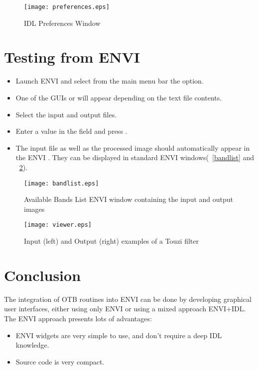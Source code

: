 \begin{figure}
\label{preferences}
\begin{center}
\texttt{[image: preferences.eps]}
\caption{IDL Preferences Window}
\end{center}
\end{figure}



\section{Testing from ENVI}
\begin{itemize}
    \item Launch ENVI and select from the main menu bar the  option.
    \item One of the GUIs  or  will appear depending on the  text file contents. 
    \item Select the input and output files. 
    \item Enter a value in the  field and press .
    \item The input file as well as the processed image should automatically appear in the ENVI  . 
          They can be displayed in standard ENVI windows(~\ref{bandlist} and ~\ref{viewer}).
\end{itemize}

\begin{figure}
    \begin{minipage}[b]{.46\linewidth}
        \centering\texttt{[image: bandlist.eps]}
        \caption{ Available Bands List ENVI window containing the input and output images}
        \label{bandlist}
    \end{minipage} \hfill
    \begin{minipage}[b]{.46\linewidth}
        \centering\texttt{[image: viewer.eps]}
        \caption{Input (left) and Output (right)  examples of a Touzi filter}
        \label{viewer}
    \end{minipage}
\end{figure}

\section{Conclusion}
The integration of OTB routines into ENVI can be done by developing graphical user interfaces, either using only ENVI or using a mixed approach ENVI+IDL. 
The ENVI approach presents lots of advantages:
\begin{itemize}
    \item ENVI widgets are very simple to use, and don't require a deep IDL knowledge.
    \item Source code is very compact.
\end{itemize}

